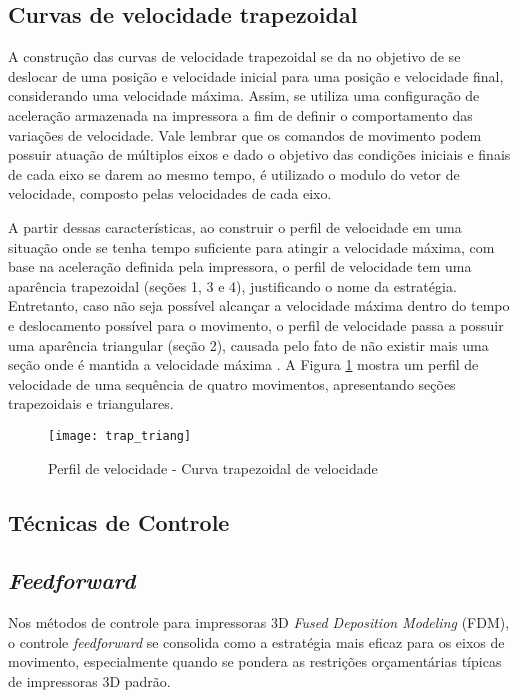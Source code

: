\subsection{Curvas de velocidade trapezoidal}
A construção das curvas de velocidade trapezoidal se da no objetivo de se deslocar de uma posição e velocidade inicial para uma posição e velocidade final, considerando uma velocidade máxima. Assim, se utiliza uma configuração de aceleração armazenada na impressora a fim de definir o comportamento das variações de velocidade. Vale lembrar que os comandos de movimento podem possuir atuação de múltiplos eixos e dado o objetivo das condições iniciais e finais de cada eixo se darem ao mesmo tempo, é utilizado o modulo do vetor de velocidade, composto pelas velocidades de cada eixo.

A partir dessas características, ao construir o perfil de velocidade em uma situação onde se tenha tempo suficiente para atingir a velocidade máxima, com base na aceleração definida pela impressora, o perfil de velocidade tem uma aparência trapezoidal (seções 1, 3 e 4), justificando o nome da estratégia. Entretanto, caso não seja possível alcançar a velocidade máxima dentro do tempo e deslocamento possível para o movimento, o perfil de velocidade passa a possuir uma aparência triangular (seção 2), causada pelo fato de não existir mais uma seção onde é mantida a velocidade máxima \cite{yu20,klipperkinematic}. A Figura \ref{fig:trap_triang} mostra um perfil de velocidade de uma sequência de quatro movimentos, apresentando seções trapezoidais e triangulares.

\begin{figure}[H]
    \centering
    \caption{Perfil de velocidade - Curva trapezoidal de velocidade}
    \texttt{[image: trap\_triang]}
    \label{fig:trap_triang}
\end{figure}

\subsection{Técnicas de Controle}

\subsection{\textit{Feedforward}}
Nos métodos de controle para impressoras 3D \textit{Fused Deposition Modeling} (FDM), o controle \textit{feedforward} se consolida como a estratégia mais eficaz para os eixos de movimento, especialmente quando se pondera as restrições orçamentárias típicas de impressoras 3D padrão.

